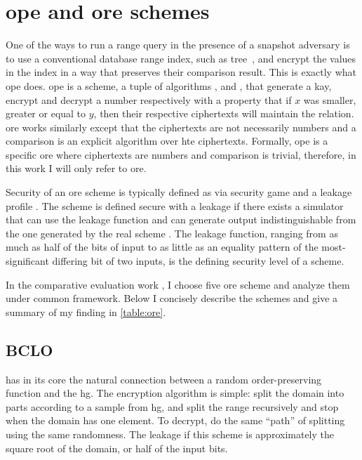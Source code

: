 	\section{\acrshort{ope} and \acrshort{ore} schemes}

		One of the ways to run a range query in the presence of a snapshot adversary is to use a conventional database range index, such as \BPlus{} tree~\cite{b-tree}, and encrypt the values in the index in a way that preserves their comparison result.
		This is exactly what \gls{ope} does.
		\gls{ope} is a scheme, a tuple of algorithms ,  and , that generate a kay, encrypt and decrypt a number respectively with a property that if $x$ was smaller, greater or equal to $y$, then their respective ciphertexts will maintain the relation.
		\gls{ore} works similarly except that the ciphertexts are not necessarily numbers and a comparison is an explicit algorithm  over hte ciphertexts.
		Formally, \gls{ope} is a specific \gls{ore} where ciphertexts are numbers and comparison is trivial, therefore, in this work I will only refer to \gls{ore}.

		Security of an \gls{ore} scheme is typically defined as via security game and a leakage profile \cite{practical-ore}.
		The scheme is defined secure with a leakage \leakage{} if there exists a simulator that can use the leakage function and can generate output indistinguishable from the one generated by the real scheme \cite{ore-benchmark-17}.
		The leakage function, ranging from as much as half of the bits of input to as little as an equality pattern of the most-significant differing bit of two inputs, is the defining security level of a scheme.

		In the comparative evaluation work \cite{ore-benchmark-17}, I choose five \gls{ore} scheme and analyze them under common framework.
		Below I concisely describe the schemes and give a summary of my finding in \cref{table:ore}.

		\subsection{BCLO}

			\cite{bclo-ope} has in its core the natural connection between a random order-preserving function and the \gls{hg}.
			The encryption algorithm is simple: split the domain into parts according to a sample from \gls{hg}, and split the range recursively and stop when the domain has one element.
			To decrypt, do the same ``path'' of splitting using the same randomness.
			The leakage if this scheme is approximately the square root of the domain, or half of the input bits.

